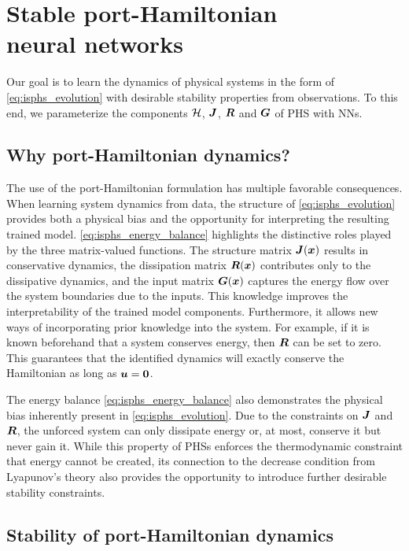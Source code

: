 \section[Stable port-Hamiltonian neural networks]{Stable port-Hamiltonian\\neural networks}\label{sec:sPHNN}

Our goal is to learn the dynamics of physical systems in the form of \cref{eq:isphs_evolution} with desirable stability properties from observations. 
To this end, we parameterize the components ${\mathcal{H}}$, $\boldsymbol{J}$, $\boldsymbol{R}$ and $\boldsymbol{G}$ of \gls{PHS} with \glspl{NN}. 

\subsection{Why port-Hamiltonian dynamics?}

The use of the port-Hamiltonian formulation has multiple favorable consequences. 
When learning system dynamics from data, the structure of \cref{eq:isphs_evolution} provides both a physical bias and the opportunity for interpreting the resulting trained model. 
\cref{eq:isphs_energy_balance} highlights the distinctive roles played by the three matrix-valued functions. The structure matrix $\boldsymbol{J}(\boldsymbol{x})$ results in conservative dynamics, the dissipation matrix $\boldsymbol{R}(\boldsymbol{x})$ contributes only to the dissipative dynamics, and the input matrix $\boldsymbol{G}(\boldsymbol{x})$ captures the energy flow over the system boundaries due to the inputs. This knowledge improves the interpretability of the trained model components. Furthermore, it allows new ways of incorporating prior knowledge into the system. For example, if it is known beforehand that a system conserves energy, then $\boldsymbol{R}$ can be set to zero. 
This guarantees that the identified dynamics will exactly conserve the Hamiltonian as long as $\boldsymbol{u}=\boldsymbol{0}$.

The energy balance \cref{eq:isphs_energy_balance} also demonstrates the physical bias inherently present in \cref{eq:isphs_evolution}. 
Due to the constraints on $\boldsymbol{J}$ and $\boldsymbol{R}$, the unforced system can only dissipate energy or, at most, conserve it but never gain it. While this property of \glspl{PHS} enforces the thermodynamic constraint that energy cannot be created, its connection to the decrease condition from Lyapunov's theory also provides the opportunity to introduce further desirable stability constraints.

\subsection{Stability of port-Hamiltonian dynamics}


